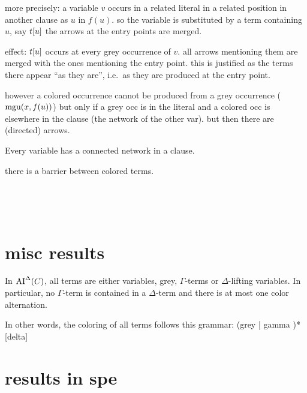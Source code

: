 \documentclass[,%
	paper=a4,%
	DIV11, %
	twoside=false,%
	liststotoc,
	bibtotoc,
	draft=false,%
	numbers=noendperiod
]{scrartcl}
\begin{document}
more precisely: %
a variable $v$ occurs in a related literal in a related position in another clause as $u$ in $f(u)$.
so the variable is substituted by a term containing $u$, say $t[u]$
the arrows at the entry points are merged.

effect: 
$t[u]$ occurs at every grey occurrence of $v$. all arrows mentioning them are merged with the ones mentioning the entry point.
this is justified as the terms there appear ``as they are'', i.e.\ as they are produced at the entry point.

however a colored occurrence cannot be produced from a grey occurrence ($\operatorname{mgu}(x, f(u))$) but only if a grey occ is in the literal and a colored occ is elsewhere in the clause (the network of the other var). but then there are (directed) arrows.


Every variable has a connected network in a clause. 

there is a barrier between colored terms.

~

~

\clearpage
\section{misc results}

\begin{prop}
	\label{prop:no_delta_term_in_ai_delta}
	In $\operatorname{AI}^\Delta(C)$, all terms are either variables, grey, $\Gamma$-terms or $\Delta$-lifting variables. 
	In particular, no $\Gamma$-term is contained in a $\Delta$-term and there is at most one color alternation. 

	In other words, the coloring of all terms follows this grammar:
	(grey | gamma )* [delta]

\end{prop}
\section{results in spe}
\end{document}
